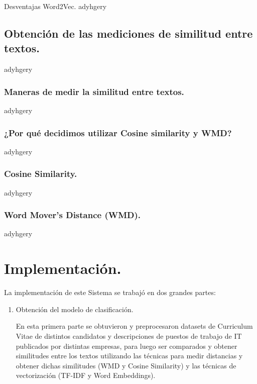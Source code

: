 \documentclass[12pt,a4paper]{article}
\makeatletter
\renewcommand\paragraph{\@startsection{paragraph}{4}{\z@}
            {-2.5ex\@plus -1ex \@minus -.25ex}
            {1.25ex \@plus .25ex}
            {\normalfont\normalsize\bfseries}}
\makeatother
\begin{document}
\begin{sloppypar}
\paragraph{Desventajas Word2Vec.}\label{desv_word2vec}
adyhgery
\cleardoublepage

\subsection{Obtención de las mediciones de similitud entre textos.}\label{med_sim_textos}
adyhgery
\cleardoublepage

\subsubsection{Maneras de medir la similitud entre textos.}\label{Tecnicas_Simil_textos}
adyhgery
\cleardoublepage

\subsubsection{¿Por qué decidimos utilizar Cosine similarity y WMD?}\label{cos_y_wmd}
adyhgery
\cleardoublepage

\subsubsection{Cosine Similarity.}\label{cosine}
adyhgery
\cleardoublepage

\subsubsection{Word Mover’s Distance (WMD).}\label{wmd}
adyhgery
\cleardoublepage


\section{Implementación.}\label{5.Implementacion}

La implementación de este Sistema se trabajó en dos grandes partes:
\begin{enumerate}
\item Obtención del modelo de clasificación. 

En esta primera parte se obtuvieron y preprocesaron datasets de Curriculum Vitae de distintos candidatos y descripciones de puestos de trabajo de IT publicados por distintas empresas, para luego ser comparados y obtener similitudes entre los textos utilizando las técnicas para medir distancias y obtener dichas similitudes (WMD y Cosine Similarity) y las técnicas de vectorización (TF-IDF y Word Embeddings).


\end{enumerate}
\end{sloppypar}
\end{document}

